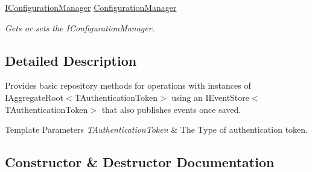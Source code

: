 \begin{DoxyCompactItemize}
\hyperlink{interfaceCqrs_1_1Configuration_1_1IConfigurationManager}{I\+Configuration\+Manager} \hyperlink{classCqrs_1_1Domain_1_1AggregateRepository_acc91846378f7b76e0549586fc64d3e91_acc91846378f7b76e0549586fc64d3e91}{Configuration\+Manager}
\begin{DoxyCompactList}\small\item\em Gets or sets the I\+Configuration\+Manager. \end{DoxyCompactList}\end{DoxyCompactItemize}


\subsection{Detailed Description}
Provides basic repository methods for operations with instances of I\+Aggregate\+Root$<$\+T\+Authentication\+Token$>$ using an I\+Event\+Store$<$\+T\+Authentication\+Token$>$ that also publishes events once saved. 


\begin{DoxyTemplParams}{Template Parameters}
{\em T\+Authentication\+Token} & The Type of authentication token.\\
\hline
\end{DoxyTemplParams}


\subsection{Constructor \& Destructor Documentation}
\mbox{\label{classCqrs_1_1Domain_1_1AggregateRepository_a12a5588533a7eb2cdd061576ad53c8ac_a12a5588533a7eb2cdd061576ad53c8ac}} 

